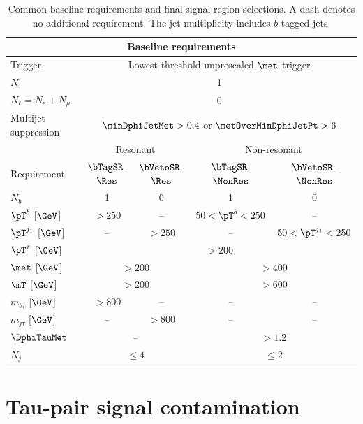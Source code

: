 \begin{table}[htbp]
    \centering
    \small
    \caption{Common baseline requirements and final signal-region selections. A dash denotes no additional requirement. The jet multiplicity includes $b$-tagged jets.}
    \label{tab:ch7_signal_regions}
    \begin{tabular}{lcccc}
        \toprule
        \multicolumn{5}{c}{Baseline requirements} \\
        \midrule
        Trigger & \multicolumn{4}{c}{Lowest-threshold unprescaled $\met$ trigger} \\
        $N_\tau$ & \multicolumn{4}{c}{1} \\
        $N_\ell=N_e+N_\mu$ & \multicolumn{4}{c}{0} \\
        Multijet suppression & \multicolumn{4}{c}{$\minDphiJetMet>0.4$ or $\metOverMinDphiJetPt>6$} \\
        \midrule
        & \multicolumn{2}{c}{Resonant} & \multicolumn{2}{c}{Non-resonant} \\
        Requirement & $\bTagSR$-$\Res$ & $\bVetoSR$-$\Res$ & $\bTagSR$-$\NonRes$ & $\bVetoSR$-$\NonRes$ \\
        \midrule
        $N_b$ & 1 & 0 & 1 & 0 \\
        $\pT^b$ [$\GeV$] & $>250$ & -- & $50<\pT^b<250$ & -- \\
        $\pT^{j_1}$ [$\GeV$] & -- & $>250$ & -- & $50<\pT^{j_1}<250$ \\
        $\pT^\tau$ [$\GeV$] & \multicolumn{4}{c}{$>200$} \\
        $\met$ [$\GeV$] & \multicolumn{2}{c}{$>200$} & \multicolumn{2}{c}{$>400$} \\
        $\mT$ [$\GeV$] & \multicolumn{2}{c}{$>200$} & \multicolumn{2}{c}{$>600$} \\
        $m_{b\tau}$ [$\GeV$] & $>800$ & -- & -- & -- \\
        $m_{j\tau}$ [$\GeV$] & -- & $>800$ & -- & -- \\
        $\DphiTauMet$ & \multicolumn{2}{c}{--} & \multicolumn{2}{c}{$>1.2$} \\
        $N_j$ & \multicolumn{2}{c}{$\leq4$} & \multicolumn{2}{c}{$\leq2$} \\
        \bottomrule
    \end{tabular}
\end{table}

\clearpage
\section{Tau-pair signal contamination}
\label{sec:ch7_tautau_contamination}


